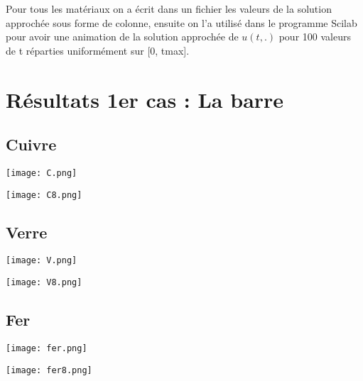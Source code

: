 \documentclass[french]{report}
\begin{document}
Pour tous les matériaux on a écrit dans un fichier les valeurs de la solution approchée sous forme de colonne, ensuite on l'a utilisé dans le programme Scilab pour avoir une animation de la solution approchée de $u(t, .)$ pour 100 valeurs de t réparties uniformément sur [0, tmax].

\section{Résultats 1er cas : La barre}
\subsection{Cuivre} 

\begin{minipage}[c]{.46\linewidth}
     \begin{center}
           
             \texttt{[image: C.png]}
            
         \end{center}
   \end{minipage} \hfill
   \begin{minipage}[c]{.46\linewidth}
    \begin{center}
            \texttt{[image: C8.png]}
        \end{center}
 \end{minipage}

\subsection{Verre}
\begin{minipage}[c]{.46\linewidth}
     \begin{center}
             \texttt{[image: V.png]}
         \end{center}
   \end{minipage} \hfill
   \begin{minipage}[c]{.46\linewidth}
    \begin{center}
            \texttt{[image: V8.png]}
        \end{center}
 \end{minipage}
 
 \subsection{Fer}
\begin{minipage}[c]{.46\linewidth}
     \begin{center}
             \texttt{[image: fer.png]}
         \end{center}
   \end{minipage} \hfill
   \begin{minipage}[c]{.46\linewidth}
    \begin{center}
            \texttt{[image: fer8.png]}
        \end{center}
 \end{minipage}
 
\end{document}
